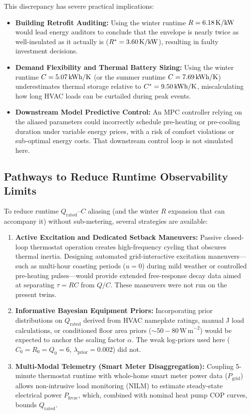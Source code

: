 \documentclass[11pt,letterpaper]{article}
\begin{document}
This discrepancy has severe practical implications:
\begin{itemize}
\item \textbf{Building Retrofit Auditing:} Using the winter runtime $R = 6.18\,\mathrm{K/kW}$ would lead energy auditors to conclude that the envelope is nearly twice as well-insulated as it actually is ($R^* = 3.60\,\mathrm{K/kW}$), resulting in faulty investment decisions.
\item \textbf{Demand Flexibility and Thermal Battery Sizing:} Using the winter runtime $C = 5.07\,\mathrm{kWh/K}$ (or the summer runtime $C = 7.69\,\mathrm{kWh/K}$) underestimates thermal storage relative to $C^* = 9.50\,\mathrm{kWh/K}$, miscalculating how long HVAC loads can be curtailed during peak events.
\item \textbf{Downstream Model Predictive Control:} An MPC controller relying on the aliased parameters could incorrectly schedule pre-heating or pre-cooling duration under variable energy prices, with a risk of comfort violations or sub-optimal energy costs. That downstream control loop is not simulated here.
\end{itemize}

\subsection{Pathways to Reduce Runtime Observability Limits}
\label{sec:discussion-pathways}
To reduce runtime $Q_\mathrm{rated}$--$C$ aliasing (and the winter $R$ expansion that can accompany it) without sub-metering, several strategies are available:
\begin{enumerate}
\item \textbf{Active Excitation and Dedicated Setback Maneuvers:} Passive closed-loop thermostat operation creates high-frequency cycling that obscures thermal inertia. Designing automated grid-interactive excitation maneuvers---such as multi-hour coasting periods ($u = 0$) during mild weather or controlled pre-heating pulses---would provide extended free-response decay data aimed at separating $\tau = RC$ from $Q/C$. These maneuvers were not run on the present twins.
\item \textbf{Informative Bayesian Equipment Priors:} Incorporating prior distributions on $Q_\mathrm{rated}$ derived from HVAC nameplate ratings, manual J load calculations, or conditioned floor area priors ($\sim 50-80\,\mathrm{W\,m}^{-2}$) would be expected to anchor the scaling factor $\alpha$. The weak log-priors used here ($C_0=R_0=Q_0=6$, $\lambda_\mathrm{prior}=0.002$) did not.
\item \textbf{Multi-Modal Telemetry (Smart Meter Disaggregation):} Coupling 5-minute thermostat runtime with whole-home smart meter power data ($P_\mathrm{grid}$) allows non-intrusive load monitoring (NILM) to estimate steady-state electrical power $P_\mathrm{hvac}$, which, combined with nominal heat pump COP curves, bounds $Q_\mathrm{rated}$.
\end{enumerate}
\end{document}
